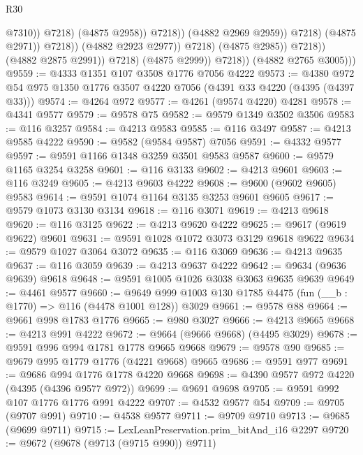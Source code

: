 \begin{lexlean}{R30}
\begin{coremodule}
                                                  @7310))
                                              @7218)
                                            (@4875 @2958))
                                          @7218))
                                      (@4882 @2969 @2959))
                                    @7218)
                                  (@4875 @2971))
                                @7218))
                            (@4882 @2923 @2977))
                          @7218)
                        (@4875 @2985))
                      @7218))
                  (@4882 @2875 @2991))
                @7218)
              (@4875 @2999))
            @7218))
        (@4882 @2765 @3005)))
@9559 := @4333 @1351 @107 @3508 @1776 @7056 @4222
@9573 := @4380 @972 @54 @975 @1350 @1776 @3507 @4220 @7056 (@4391 @33 @4220 (@4395 (@4397 @33)))
@9574 := @4264 @972
@9577 := @4261 (@9574 @4220) @4281
@9578 := @4341 @9577
@9579 := @9578 @75
@9582 := @9579 @1349 @3502 @3506
@9583 := @116 @3257
@9584 := @4213 @9583
@9585 := @116 @3497
@9587 := @4213 @9585 @4222
@9590 := @9582 (@9584 @9587) @7056
@9591 := @4332 @9577
@9597 := @9591 @1166 @1348 @3259 @3501 @9583 @9587
@9600 := @9579 @1165 @3254 @3258
@9601 := @116 @3133
@9602 := @4213 @9601
@9603 := @116 @3249
@9605 := @4213 @9603 @4222
@9608 := @9600 (@9602 @9605) @9583
@9614 := @9591 @1074 @1164 @3135 @3253 @9601 @9605
@9617 := @9579 @1073 @3130 @3134
@9618 := @116 @3071
@9619 := @4213 @9618
@9620 := @116 @3125
@9622 := @4213 @9620 @4222
@9625 := @9617 (@9619 @9622) @9601
@9631 := @9591 @1028 @1072 @3073 @3129 @9618 @9622
@9634 := @9579 @1027 @3064 @3072
@9635 := @116 @3069
@9636 := @4213 @9635
@9637 := @116 @3059
@9639 := @4213 @9637 @4222
@9642 := @9634 (@9636 @9639) @9618
@9648 := @9591 @1005 @1026 @3038 @3063 @9635 @9639
@9649 := @4461 @9577
@9660 := @9649 @999 @1003 @130 @1785 @4475 (fun (__b : @1770) => @116 (@4478 @1001 @128)) @3029
@9661 := @9578 @88
@9664 := @9661 @998 @1783 @1776
@9665 := @980 @3027
@9666 := @4213 @9665
@9668 := @4213 @991 @4222
@9672 := @9664 (@9666 @9668) (@4495 @3029)
@9678 := @9591 @996 @994 @1781 @1778 @9665 @9668
@9679 := @9578 @90
@9685 := @9679 @995 @1779 @1776 (@4221 @9668) @9665
@9686 := @9591 @977
@9691 := @9686 @994 @1776 @1778 @4220 @9668
@9698 := @4390 @9577 @972 @4220 (@4395 (@4396 @9577 @972))
@9699 := @9691 @9698
@9705 := @9591 @992 @107 @1776 @1776 @991 @4222
@9707 := @4532 @9577 @54
@9709 := @9705 (@9707 @991)
@9710 := @4538 @9577
@9711 := @9709 @9710
@9713 := @9685 (@9699 @9711)
@9715 := LexLeanPreservation.prim_bitAnd_i16 @2297
@9720 := @9672 (@9678 (@9713 (@9715 @990)) @9711)

\end{coremodule}
\end{lexlean}
